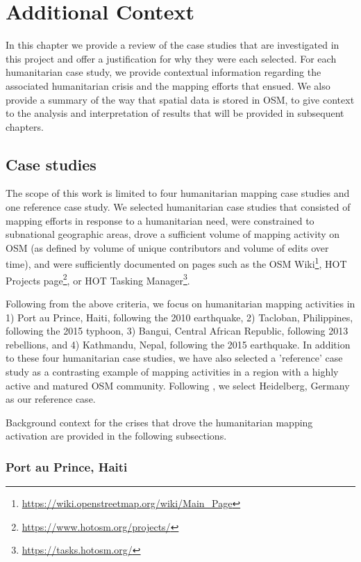 \chapter{Additional Context}
\label{chapterlabel3}

In this chapter we provide a review of the case studies that are investigated in this project and offer a justification for why they were each selected. For each humanitarian case study, we provide contextual information regarding the associated humanitarian crisis and the mapping efforts that ensued. We also provide a summary of the way that spatial data is stored in OSM, to give context to the analysis and interpretation of results that will be provided in subsequent chapters.


\section{Case studies}

The scope of this work is limited to four humanitarian mapping case studies and one reference case study. We selected humanitarian case studies that consisted of mapping efforts in response to a humanitarian need, were constrained to subnational geographic areas, drove a sufficient volume of mapping activity on OSM (as defined by volume of unique contributors and volume of edits over time), and were sufficiently documented on pages such as the OSM Wiki\footnote{\url{https://wiki.openstreetmap.org/wiki/Main_Page}}, HOT Projects page\footnote{\url{https://www.hotosm.org/projects/}}, or HOT Tasking Manager\footnote{\url{https://tasks.hotosm.org/}}. 

Following from the above criteria, we focus on humanitarian mapping activities in 1) Port au Prince, Haiti, following the 2010 earthquake, 2) Tacloban, Philippines, following the 2015 typhoon, 3) Bangui, Central African Republic, following 2013 rebellions, and 4) Kathmandu, Nepal, following the 2015 earthquake. In addition to these four humanitarian case studies, we have also selected a 'reference' case study as a contrasting example of mapping activities in a region with a highly active and matured OSM community. Following \textcite{anderson_crowd_2018}, we select Heidelberg, Germany as our reference case. 

Background context for the crises that drove the humanitarian mapping activation are provided in the following subsections.

\subsection{Port au Prince, Haiti}

